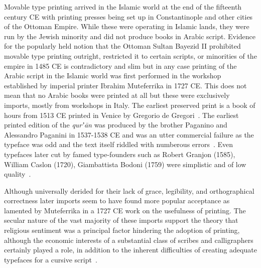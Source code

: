 Movable type printing arrived in the Islamic world at the end of the fifteenth
century CE with printing presses being set up in Constantinople and other
cities of the Ottoman Empire. While these were operating in Islamic lands, they
were run by the Jewish minority and did not produce books in Arabic script.
Evidence for the popularly held notion that the Ottoman Sultan Bayezid II
prohibited movable type printing outright, restricted it to certain scripts, or
minorities of the empire in 1485 CE is contradictory and slim
\cite{schwartz2017did} but in any case printing of the Arabic script in the
Islamic world was first performed in the workshop established by imperial
printer Ibrahim Muteferrika in 1727 CE. This does not mean that no Arabic books
were printed at all but these were exclusively imports, mostly from workshops
in Italy. The earliest preserved print is a book of hours from 1513 CE printed
in Venice by Gregorio de Gregori~\cite{krek1979enigma}. The earliest printed
edition of the \emph{qurʼān} was produced by the brother Paganino and Alessandro
Paganini in 1537-1538 CE and was an utter commercial failure as the typeface
was odd and the text itself riddled with numberous errors~\cite[pg.
219-220]{bloompaper}. Even typefaces later cut by famed type-founders such as
Robert Granjon (1585), William Caslon (1720), Giambattista Bodoni (1759) were
simplistic and of low quality~\cite{tracy1975advances}. 

Although universally derided for their lack of grace, legibility, and
orthographical correctness later imports seem to have found more popular
acceptance as lamented by Muteferrika in a 1727 CE work on the usefulness of
printing. The secular nature of the vast majority of these imports support the
theory that religious sentiment was a principal factor hindering the adoption
of printing, although the economic interests of a substantial class of scribes
and calligraphers certainly played a role, in addition to the inherent
difficulties of creating adequate typefaces for a cursive script~\cite[pg.
605]{blair2006islamic}.

